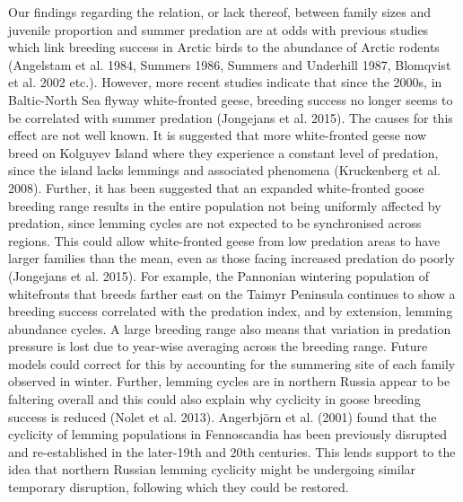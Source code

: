\documentclass[10pt,twocolumn]{paper}
\begin{document}
Our findings regarding the relation, or lack thereof, between family
sizes and juvenile proportion and summer predation are at odds with
previous studies which link breeding success in Arctic birds to the
abundance of Arctic rodents (Angelstam et al. 1984, Summers 1986,
Summers and Underhill 1987, Blomqvist et al. 2002 etc.). However, more
recent studies indicate that since the 2000s, in Baltic-North Sea flyway
white-fronted geese, breeding success no longer seems to be correlated
with summer predation (Jongejans et al. 2015). The causes for this
effect are not well known. It is suggested that more white-fronted geese
now breed on Kolguyev Island where they experience a constant level of
predation, since the island lacks lemmings and associated phenomena
(Kruckenberg et al. 2008). Further, it has been suggested that an
expanded white-fronted goose breeding range results in the entire
population not being uniformly affected by predation, since lemming
cycles are not expected to be synchronised across regions. This could
allow white-fronted geese from low predation areas to have larger
families than the mean, even as those facing increased predation do
poorly (Jongejans et al. 2015). For example, the Pannonian wintering
population of whitefronts that breeds farther east on the Taimyr
Peninsula continues to show a breeding success correlated with the
predation index, and by extension, lemming abundance cycles. A large
breeding range also means that variation in predation pressure is lost
due to year-wise averaging across the breeding range. Future models
could correct for this by accounting for the summering site of each
family observed in winter. Further, lemming cycles are in northern
Russia appear to be faltering overall and this could also explain why
cyclicity in goose breeding success is reduced (Nolet et al. 2013).
Angerbjörn et al. (2001) found that the cyclicity of lemming populations
in Fennoscandia has been previously disrupted and re-established in the
later-19th and 20th centuries. This lends support to the idea that
northern Russian lemming cyclicity might be undergoing similar temporary
disruption, following which they could be restored.
\end{document}
